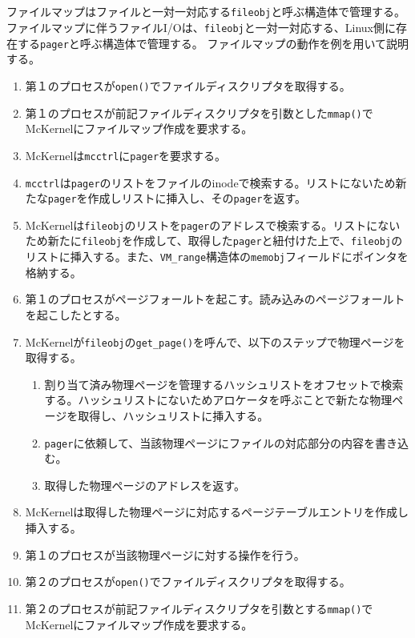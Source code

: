 \documentclass[twoside,11pt,fleqn]{book}
\begin{document}
\subsection{}
ファイルマップはファイルと一対一対応する\texttt{fileobj}と呼ぶ構造体で管理する。
ファイルマップに伴うファイルI/Oは、\texttt{fileobj}と一対一対応する、Linux側に存在する\texttt{pager}と呼ぶ構造体で管理する。
ファイルマップの動作を例を用いて説明する。
\begin{enumerate}
\item 第１のプロセスが\texttt{open()}でファイルディスクリプタを取得する。
\item 第１のプロセスが前記ファイルディスクリプタを引数とした\texttt{mmap()}でMcKernelにファイルマップ作成を要求する。
\item McKernelは\texttt{mcctrl}に\texttt{pager}を要求する。
\item \texttt{mcctrl}は\texttt{pager}のリストをファイルのinodeで検索する。リストにないため新たな\texttt{pager}を作成しリストに挿入し、その\texttt{pager}を返す。
\item McKernelは\texttt{fileobj}のリストを\texttt{pager}のアドレスで検索する。リストにないため新たに\texttt{fileobj}を作成して、取得した\texttt{pager}と紐付けた上で、\texttt{fileobj}のリストに挿入する。また、\texttt{VM\_range}構造体の\texttt{memobj}フィールドにポインタを格納する。
\item 第１のプロセスがページフォールトを起こす。読み込みのページフォールトを起こしたとする。
\item McKernelが\texttt{fileobj}の\texttt{get\_page()}を呼んで、以下のステップで物理ページを取得する。
\begin{enumerate}
\item 割り当て済み物理ページを管理するハッシュリストをオフセットで検索する。ハッシュリストにないためアロケータを呼ぶことで新たな物理ページを取得し、ハッシュリストに挿入する。
\item \texttt{pager}に依頼して、当該物理ページにファイルの対応部分の内容を書き込む。
\item 取得した物理ページのアドレスを返す。
\end{enumerate}
\item McKernelは取得した物理ページに対応するページテーブルエントリを作成し挿入する。
\item 第１のプロセスが当該物理ページに対する操作を行う。
\item 第２のプロセスが\texttt{open()}でファイルディスクリプタを取得する。
\item 第２のプロセスが前記ファイルディスクリプタを引数とする\texttt{mmap()}でMcKernelにファイルマップ作成を要求する。

\end{enumerate}
\end{document}
